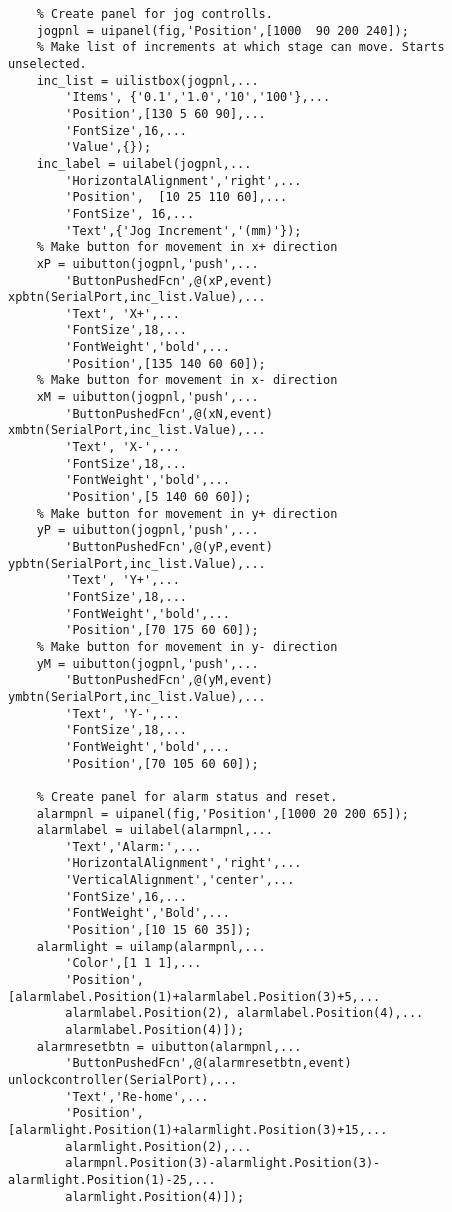 \begin{lstlisting}
	% Create panel for jog controlls.
    jogpnl = uipanel(fig,'Position',[1000  90 200 240]);
	% Make list of increments at which stage can move. Starts unselected.
    inc_list = uilistbox(jogpnl,...
        'Items', {'0.1','1.0','10','100'},...
        'Position',[130 5 60 90],...
        'FontSize',16,...
        'Value',{});
    inc_label = uilabel(jogpnl,...
        'HorizontalAlignment','right',...
        'Position',  [10 25 110 60],...
        'FontSize', 16,...
        'Text',{'Jog Increment','(mm)'});
	% Make button for movement in x+ direction
    xP = uibutton(jogpnl,'push',...
        'ButtonPushedFcn',@(xP,event) xpbtn(SerialPort,inc_list.Value),...
        'Text', 'X+',...
        'FontSize',18,...
        'FontWeight','bold',...
        'Position',[135 140 60 60]);
	% Make button for movement in x- direction
    xM = uibutton(jogpnl,'push',...
        'ButtonPushedFcn',@(xN,event) xmbtn(SerialPort,inc_list.Value),...
        'Text', 'X-',...
        'FontSize',18,...
        'FontWeight','bold',...
        'Position',[5 140 60 60]);
	% Make button for movement in y+ direction
    yP = uibutton(jogpnl,'push',...
        'ButtonPushedFcn',@(yP,event) ypbtn(SerialPort,inc_list.Value),...
        'Text', 'Y+',...
        'FontSize',18,...
        'FontWeight','bold',...
        'Position',[70 175 60 60]);
	% Make button for movement in y- direction
    yM = uibutton(jogpnl,'push',...
        'ButtonPushedFcn',@(yM,event) ymbtn(SerialPort,inc_list.Value),...
        'Text', 'Y-',...
        'FontSize',18,...
        'FontWeight','bold',...
        'Position',[70 105 60 60]);
    
	% Create panel for alarm status and reset.
    alarmpnl = uipanel(fig,'Position',[1000 20 200 65]);
    alarmlabel = uilabel(alarmpnl,...
        'Text','Alarm:',...
        'HorizontalAlignment','right',...
        'VerticalAlignment','center',...
        'FontSize',16,...
        'FontWeight','Bold',...
        'Position',[10 15 60 35]);
    alarmlight = uilamp(alarmpnl,...
        'Color',[1 1 1],...
        'Position',[alarmlabel.Position(1)+alarmlabel.Position(3)+5,...
        alarmlabel.Position(2), alarmlabel.Position(4),...
        alarmlabel.Position(4)]);
    alarmresetbtn = uibutton(alarmpnl,...
        'ButtonPushedFcn',@(alarmresetbtn,event) unlockcontroller(SerialPort),...
        'Text','Re-home',...
        'Position',[alarmlight.Position(1)+alarmlight.Position(3)+15,...
        alarmlight.Position(2),...
        alarmpnl.Position(3)-alarmlight.Position(3)-alarmlight.Position(1)-25,...
        alarmlight.Position(4)]);
    

\end{lstlisting}
